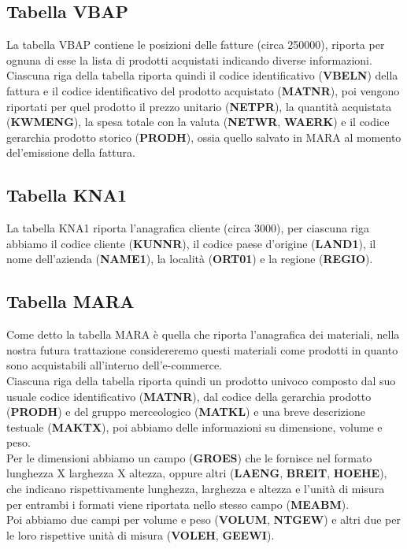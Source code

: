 \subsection{Tabella VBAP}
La tabella VBAP contiene le posizioni delle fatture (circa 250000), riporta per ognuna di esse la lista di prodotti acquistati indicando diverse informazioni.
Ciascuna riga della tabella riporta quindi il codice identificativo (\textbf{VBELN}) della fattura e il codice identificativo del prodotto acquistato (\textbf{MATNR}), poi vengono riportati per quel prodotto il prezzo unitario (\textbf{NETPR}), la quantità acquistata (\textbf{KWMENG}), la spesa totale con la valuta (\textbf{NETWR}, \textbf{WAERK}) e il codice gerarchia prodotto storico (\textbf{PRODH}), ossia quello salvato in MARA al momento del'emissione della fattura.

\subsection{Tabella KNA1}
La tabella KNA1 riporta l'anagrafica cliente (circa 3000), per ciascuna riga abbiamo il codice cliente (\textbf{KUNNR}), il codice paese d'origine (\textbf{LAND1}), il nome dell'azienda (\textbf{NAME1}), la località (\textbf{ORT01}) e la regione (\textbf{REGIO}).

\subsection{Tabella MARA}
Come detto la tabella MARA è quella che riporta l'anagrafica dei materiali, nella nostra futura trattazione considereremo questi materiali come prodotti in quanto sono acquistabili all'interno dell'e-commerce.\\
Ciascuna riga della tabella riporta quindi un prodotto univoco composto dal suo usuale codice identificativo (\textbf{MATNR}), dal codice della gerarchia prodotto (\textbf{PRODH}) e del gruppo merceologico (\textbf{MATKL}) e una breve descrizione testuale (\textbf{MAKTX}), poi abbiamo delle informazioni su dimensione, volume e peso.\\
Per le dimensioni abbiamo un campo (\textbf{GROES}) che le fornisce nel formato lunghezza X larghezza X altezza, oppure altri (\textbf{LAENG}, \textbf{BREIT}, \textbf{HOEHE}), che indicano rispettivamente lunghezza, larghezza e altezza e l'unità di misura per entrambi i formati viene riportata nello stesso campo (\textbf{MEABM}). \\
Poi abbiamo due campi per volume e peso (\textbf{VOLUM}, \textbf{NTGEW}) e altri due per le loro rispettive unità di misura (\textbf{VOLEH}, \textbf{GEEWI}).

